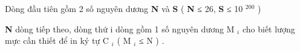 Dòng đầu tiên gồm 2 số nguyên dương   \textbf{    N   }   và   \textbf{    S   }   (   \textbf{    N   }   ≤ 26,   \textbf{    S   }   ≤ 10   $^    200   $   )  

\textbf{    N   }   dòng tiếp theo, dòng thứ i dòng gồm 1 số nguyên dương M   $_    i   $   cho biết lượng mực cần thiết để in ký tự C   $_    i   $   ( M   $_    i   $   ≤ N ) .  

\